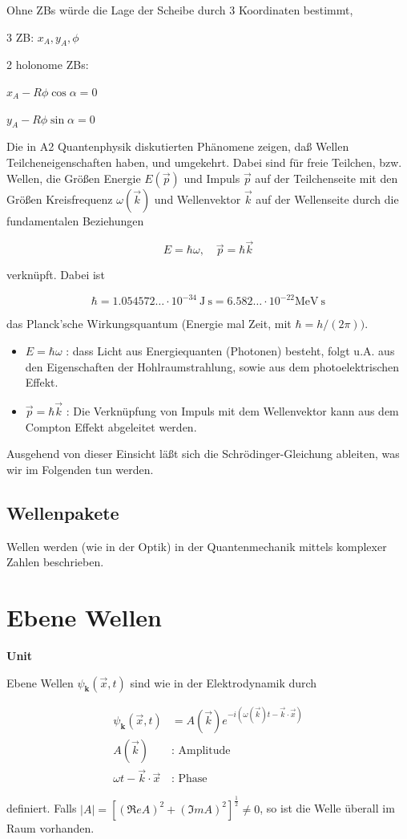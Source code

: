 \documentclass[10pt, letterpaper]{article}
\newenvironment{unit}[1]
  {\begin{unitbox}\textbf{Unit #1}\par\smallskip}
  {\end{unitbox}}
\begin{document}
Ohne ZBs würde die Lage der Scheibe durch 3 Koordinaten bestimmt,

3 ZB: $x_A, y_A, \phi$

2 holonome ZBs:

$x_A - R\phi \cos\alpha = 0$

$y_A - R\phi \sin\alpha = 0$


Die in A2 Quantenphysik diskutierten Phänomene zeigen, daß Wellen Teilcheneigenschaften haben, und umgekehrt. Dabei sind für freie Teilchen, bzw. Wellen, die Größen Energie $E(\vec{p})$ und Impuls $\vec{p}$ auf der Teilchenseite mit den Größen Kreisfrequenz $\omega(\vec{k})$ und Wellenvektor $\vec{k}$ auf der Wellenseite durch die fundamentalen Beziehungen

$$
E=\hbar \omega, \quad \vec{p}=\hbar \vec{k}
$$

verknüpft. Dabei ist

$$
\hbar=1.054572 \ldots \cdot 10^{-34} \mathrm{~J} \mathrm{~s}=6.582 \ldots \cdot 10^{-22} \mathrm{MeV} \mathrm{~s}
$$

das Planck'sche Wirkungsquantum (Energie mal Zeit, mit $\hbar=h /(2 \pi))$.

\begin{itemize}
  \item $E=\hbar \omega$ : dass Licht aus Energiequanten (Photonen) besteht, folgt u.A. aus den Eigenschaften der Hohlraumstrahlung, sowie aus dem photoelektrischen Effekt.
  \item $\vec{p}=\hbar \vec{k}$ : Die Verknüpfung von Impuls mit dem Wellenvektor kann aus dem Compton Effekt abgeleitet werden.
\end{itemize}

Ausgehend von dieser Einsicht läßt sich die Schrödinger-Gleichung ableiten, was wir im Folgenden tun werden.

\subsection*{Wellenpakete}
Wellen werden (wie in der Optik) in der Quantenmechanik mittels komplexer Zahlen beschrieben.

\section*{Ebene Wellen}

    \begin{unit}{}
      Ebene Wellen $\psi_{\mathbf{k}}(\vec{x}, t)$ sind wie in der Elektrodynamik durch

      $$
      \begin{aligned}
      \psi_{\mathbf{k}}(\vec{x}, t) & =A(\vec{k}) e^{-i(\omega(\vec{k}) t-\vec{k} \cdot \vec{x})} \\
      A(\vec{k}) & : \text { Amplitude } \\
      \omega t-\vec{k} \cdot \vec{x} & : \text { Phase }
      \end{aligned}
      $$
      
      definiert. Falls $|A|=\left[(\Re e A)^{2}+(\Im m A)^{2}\right]^{\frac{1}{2}} \neq 0$, so ist die Welle überall im Raum vorhanden.
    \end{unit}
\end{document}
